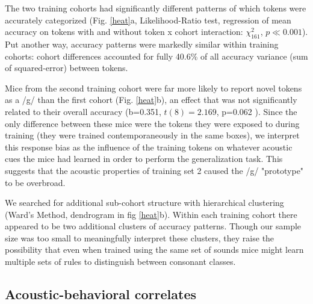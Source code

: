 The two training cohorts had significantly different patterns of which tokens were accurately categorized (Fig. \ref{heat}a, Likelihood-Ratio test, regression of mean accuracy on tokens with and without token x cohort interaction: $\chi^2_{161}$, $p \ll 0.001$). Put another way, accuracy patterns were markedly similar within training cohorts: cohort differences accounted for fully 40.6\% of all accuracy variance (sum of squared-error) between tokens.

Mice from the second training cohort were far more likely to report novel tokens as a /g/ than the first cohort (Fig. \ref{heat}b), an effect that was not significantly related to their overall accuracy (b=0.351, $t(8)=2.169$, p=0.062 ). Since the only difference between these mice were the tokens they were exposed to during training (they were trained contemporaneously in the same boxes),  we interpret this response bias as the influence of the training tokens on whatever acoustic cues the mice had learned in order to perform the generalization task. This suggests that the acoustic properties of training set 2 caused the /g/ "prototype" to be overbroad.

We searched for additional sub-cohort structure with hierarchical clustering (Ward's Method, dendrogram in fig \ref{heat}b). Within each training cohort there appeared to be two additional clusters of accuracy patterns. Though our sample size was too small to meaningfully interpret these clusters, they raise the possibility that even when trained using the same set of sounds mice might learn multiple sets of rules to distinguish between consonant classes.


%
%
%
\subsection{Acoustic-behavioral correlates}


